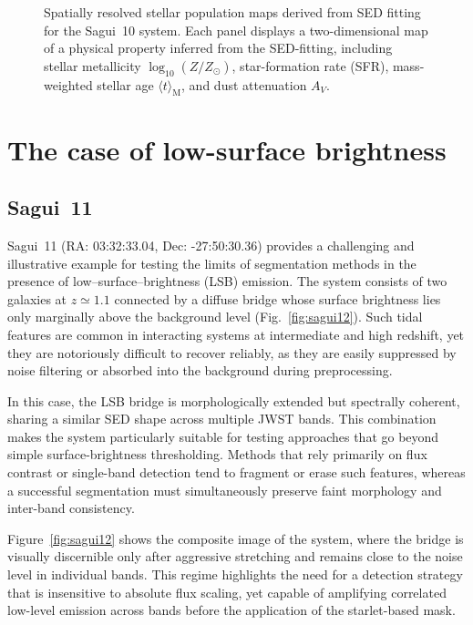 \documentclass[fleqn,usenatbib]{mnras}
\begin{document}
 \begin{figure}
\centering
{}
\caption{Spatially resolved stellar population maps derived from SED fitting for the Sagui~10 system. Each panel displays a two-dimensional map of a physical property inferred from the SED-fitting, including stellar metallicity $\log_{10}(Z/Z_\odot)$, star-formation rate (SFR), mass-weighted stellar age $\langle t\rangle_{\mathrm{M}}$, and dust attenuation $A_V$.}
\label{fig:starlet_sagui10}
\end{figure}






\section{The case of low-surface brightness}
\label{sec:lsb}

\subsection{Sagui~11}

Sagui~11 (RA: 03:32:33.04, Dec: -27:50:30.36) provides a challenging and illustrative example for
testing the limits of segmentation methods in the presence of low--surface--brightness (LSB) emission. The system consists of two galaxies at
$z \simeq 1.1$ connected by a diffuse bridge whose surface brightness lies only
marginally above the background level
(Fig.~\ref{fig:sagui12}). Such tidal features are common in interacting systems
at intermediate and high redshift, yet they are notoriously difficult to
recover reliably, as they are easily suppressed by noise filtering or absorbed
into the background during preprocessing.

In this case, the LSB bridge is morphologically extended but spectrally
coherent, sharing a similar SED shape across multiple JWST bands. This
combination makes the system particularly suitable for testing approaches that
go beyond simple surface-brightness thresholding. Methods that rely primarily
on flux contrast or single-band detection tend to fragment or erase such
features, whereas a successful segmentation must simultaneously preserve faint
morphology and inter-band consistency.

Figure~\ref{fig:sagui12} shows the composite image of the system, where the
bridge is visually discernible only after aggressive stretching and remains
close to the noise level in individual bands. This regime highlights the need
for a detection strategy that is insensitive to absolute flux scaling, yet
capable of amplifying correlated low-level emission across bands before the
application of the starlet-based mask.
\end{document}
